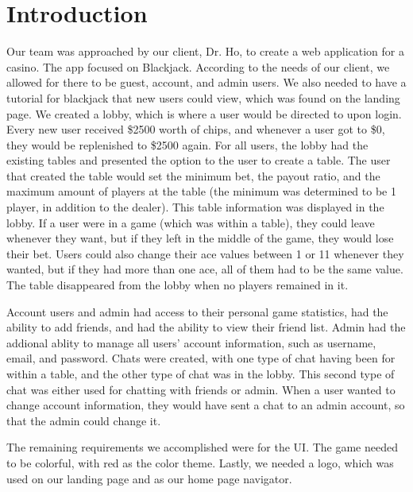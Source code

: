 \section{Introduction}

Our team was approached by our client, Dr. Ho, to create a web application for a casino. The app focused on Blackjack. According to the needs of our client, we allowed for there to be guest, account, and admin users. We also needed to have a tutorial for blackjack that new users could view, which was found on the landing page. We created a lobby, which is where a user would be directed to upon login. Every new user received \$2500 worth of chips, and whenever a user got to \$0, they would be replenished to \$2500 again. For all users, the lobby had the existing tables and presented the option to the user to create a table. The user that created the table would set the minimum bet, the payout ratio, and the maximum amount of players at the table (the minimum was determined to be 1 player, in addition to the dealer). This table information was displayed in the lobby. If a user were in a game (which was within a table), they could leave whenever they want, but if they left in the middle of the game, they would lose their bet. Users could also change their ace values between 1 or 11 whenever they wanted, but if they had more than one ace, all of them had to be the same value. The table disappeared from the lobby when no players remained in it.

Account users and admin had access to their personal game statistics, had the ability to add friends, and had the ability to view their friend list. Admin had the addional ablity to manage all users' account information, such as username, email, and password. Chats were created, with one type of chat having been for within a table, and the other type of chat was in the lobby. This second type of chat was either used for chatting with friends or admin. When a user wanted to change account information, they would have sent a chat to an admin account, so that the admin could change it.

The remaining requirements we accomplished were for the UI. The game needed to be colorful, with red as the color theme. Lastly, we needed a logo, which was used on our landing page and as our home page navigator.

